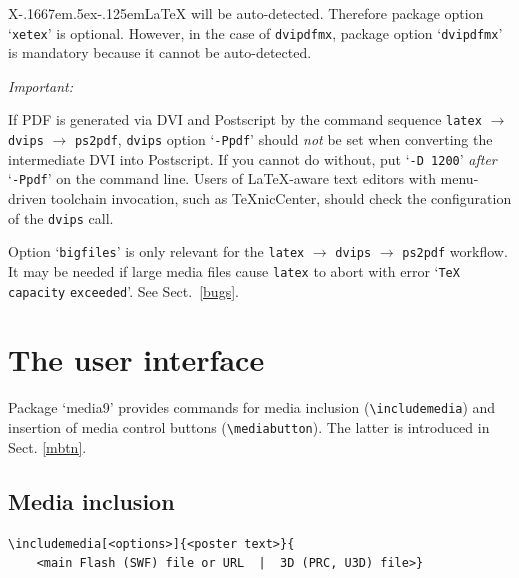\documentclass[a4paper]{article}
\def\XeLaTeX{X\kern-.1667em\lower.5ex\hbox{\reflectbox{E}}\kern-.125em\LaTeX}
\begin{document}
\XeLaTeX{} will be auto-detected. Therefore package option `\verb+xetex+' is optional. However, in the case of  \verb+dvipdfmx+, package option `\verb+dvipdfmx+' is mandatory because it cannot be auto-detected.

\begin{animateinline}{1}\strut\emph{Important:}\newframe[3]\end{animateinline} If PDF is generated via DVI and Postscript by the command sequence \verb+latex+ $\rightarrow$ \verb+dvips+ $\rightarrow$ \verb+ps2pdf+, \verb+dvips+ option `\verb+-Ppdf+' should \emph{not} be set when converting the intermediate DVI into Postscript. If you cannot do without, put `\verb+-D 1200+' \emph{after} `\verb+-Ppdf+' on the command line. Users of \LaTeX-aware text editors with menu-driven toolchain invocation, such as \TeX{}nicCenter, should check the configuration of the \verb+dvips+ call.

  Option `\verb+bigfiles+' is only relevant for the \verb+latex+ $\rightarrow$ \verb+dvips+ $\rightarrow$ \verb+ps2pdf+ workflow. It may be needed if large media files cause \verb+latex+ to abort with error `\Verb+TeX capacity+ \Verb+exceeded+'. See Sect.\ \ref{bugs}.\enlargethispage{2\baselineskip}


\section{The user interface}
Package `media9' provides commands for media inclusion (\verb+\includemedia+) and insertion of media control buttons (\verb+\mediabutton+). The latter is introduced in Sect. \ref{mbtn}.

\subsection{Media inclusion}
\begin{verbatim}
\includemedia[<options>]{<poster text>}{
    <main Flash (SWF) file or URL  |  3D (PRC, U3D) file>}
\end{verbatim}
\end{document}
